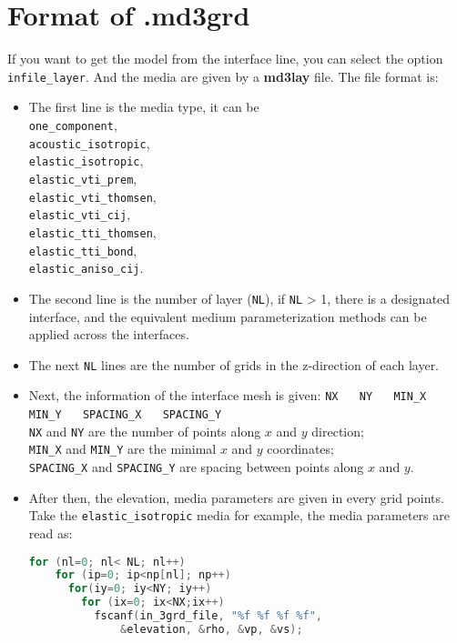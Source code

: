 \section{Format of .md3grd} \label{md3grd}

If you want to get the model from the interface line, you can select the option \texttt{infile\_layer}.
And the media are given by a \textbf{md3lay} file. The file format is:
\begin{itemize}
 \item The first line is the media type, it can be \\
 \texttt{one\_component}, \\ 
 \texttt{acoustic\_isotropic}, \\
 \texttt{elastic\_isotropic}, \\
 \texttt{elastic\_vti\_prem}, \\
 \texttt{elastic\_vti\_thomsen}, \\ 
 \texttt{elastic\_vti\_cij}, \\
 \texttt{elastic\_tti\_thomsen}, \\ 
 \texttt{elastic\_tti\_bond}, \\
 \texttt{elastic\_aniso\_cij}.

 \item The second line is the number of layer (\texttt{NL}), if \texttt{NL} > 1, there is a designated interface, and the equivalent medium parameterization methods can be applied across the interfaces.

 \item The next \texttt{NL} lines are the number of grids in the z-direction of each layer.
  
 \item {Next, the information of the interface mesh is given:
  \texttt{NX} ~~ \texttt{NY} ~~ \texttt{MIN\_X} ~~ \texttt{MIN\_Y} ~~ \texttt{SPACING\_X} ~~ \texttt{SPACING\_Y}\\
  \texttt{NX} and \texttt{NY} are the number of points along $x$ and $y$ direction;\\
  \texttt{MIN\_X} and \texttt{MIN\_Y} are the minimal $x$ and $y$ coordinates;\\
  \texttt{SPACING\_X} and \texttt{SPACING\_Y} are spacing between points along $x$ and $y$.
 }

 \item {
  After then, the elevation, media parameters are given in every grid points. Take the \texttt{elastic\_isotropic} media for example, the media parameters are read as:
  \begin{lstlisting}[language = C]
  for (nl=0; nl< NL; nl++)
    for (ip=0; ip<np[nl]; np++)
      for(iy=0; iy<NY; iy++)
        for (ix=0; ix<NX;ix++)
          fscanf(in_3grd_file, "%f %f %f %f", 
              &elevation, &rho, &vp, &vs);
  \end{lstlisting}
 } 


\end{itemize}
